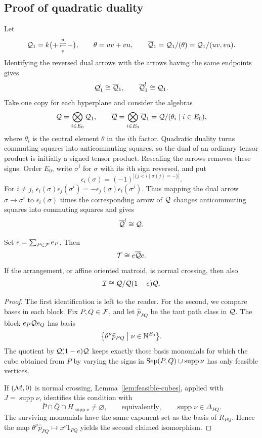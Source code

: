 \subsection{Proof of quadratic duality}
Let
\[
 \mathcal Q_1=k\bigl(+\mathop{\rightleftarrows}^{u}_{v}-\bigr),\qquad
 \theta=uv+vu,\qquad
 \overline{\mathcal Q}_1=\mathcal Q_1/(\theta)=\mathcal Q_1/(uv,vu).
\]
Identifying the
reversed dual arrows with the arrows having the same endpoints gives
\[
 \mathcal Q_1^!\cong\overline{\mathcal Q}_1,\qquad
 \overline{\mathcal Q}_1^!\cong\mathcal Q_1.
\]
Take one copy for each hyperplane and consider the algebras
\[
 \mathcal Q=\bigotimes_{i\in E_0}\mathcal Q_1,\qquad
 \overline{\mathcal Q}=\bigotimes_{i\in E_0}\overline{\mathcal Q}_1
          =\mathcal Q/(\theta_i\mid i\in E_0),
\]
where $\theta_i$ is the central element $\theta$ in the $i$th factor.
Quadratic duality turns commuting squares into anticommuting
squares, so the dual of an ordinary tensor product is initially a
signed tensor product. Rescaling the arrows removes these signs.
Order $E_0$, write $\sigma^i$ for $\sigma$ with its $i$th sign reversed,
and put
\begin{equation}\label{eq:cube-signs}
 \epsilon_i(\sigma)=(-1)^{|\{j<i\mid\sigma(j)=-\}|}.
\end{equation}
For $i\ne j$,
$\epsilon_i(\sigma)\epsilon_j(\sigma^i)
 =-\epsilon_j(\sigma)\epsilon_i(\sigma^j)$.
Thus mapping the dual arrow $\sigma\to\sigma^i$ to
$\epsilon_i(\sigma)$ times the corresponding arrow of $\mathcal Q$
changes anticommuting squares into commuting squares and gives
\[
 \overline{\mathcal Q}^!\cong\mathcal Q.
\]

\begin{proposition}\label{prop:feasible-models}
Set $e=\sum_{P\in\mathcal F}e_P$. Then
\[
 \mathcal T\cong e\overline{\mathcal Q} e.
\]
If the arrangement, or affine oriented matroid, is normal crossing,
then also
\[
 \mathcal I\cong\mathcal Q/\mathcal Q(1-e)\mathcal Q.
\]
\end{proposition}
\begin{proof}
The first identification is left to the reader.
For the second, we compare bases in each block.
Fix $P,Q\in\mathcal F$, and let $\widehat p_{PQ}$ be the taut path class
in $\mathcal Q$. The block $e_P\mathcal Q e_Q$ has basis
\[
 \bigl\{\theta^\nu\widehat p_{PQ}\bigm|\nu\in\mathbb N^{E_0}\bigr\}.
\]
The quotient by $\mathcal Q(1-e)\mathcal Q$ keeps exactly those basis
monomials for which the cube obtained from $P$ by varying the signs
in $\operatorname{Sep}(P,Q)\cup\operatorname{supp}\nu$ has only feasible vertices.

If $(\mathcal M,0)$ is normal crossing, Lemma~\ref{lem:feasible-cubes}, applied with
$J=\operatorname{supp}\nu$, identifies this condition with
\[
 \bar P\cap\bar Q\cap H_{\operatorname{supp}\nu}\ne\varnothing,
 \qquad\text{equivalently,}\qquad
 \operatorname{supp}\nu\in\Delta_{PQ}.
\]
The surviving monomials have the same exponent set as the basis
of $R_{PQ}$. Hence the map
$\theta^\nu\widehat p_{PQ}\longmapsto x^\nu 1_{PQ}$ yields the second claimed isomorphism.
\end{proof}

